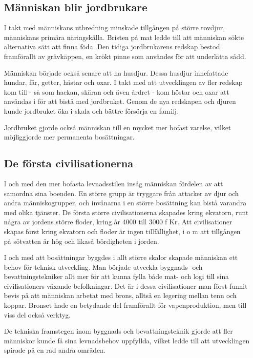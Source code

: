 \documentclass[a4paper,12pt,fleqn]{article}
\begin{document}
\subsection{Människan blir jordbrukare}
I takt med människans utbredning minskade tillgången på större rovdjur, människans primära näringskälla. Bristen på mat ledde till att människan sökte alternativa sätt att finna föda. Den tidiga jordbrukarens redskap bestod framförallt av grävkäppen, en krökt pinne som användes för att underlätta sådd. 

Människan började också senare att ha husdjur. Dessa husdjur innefattade hundar, får, getter, hästar och oxar. I takt med att utvecklingen av fler redskap kom till - så som hackan, skäran och även årdret -  kom höstar och oxar att användas i för att bistå med jordbruket. Genom de nya redskapen och djuren kunde jordbruket öka i skala och bättre försörja en familj. 

Jordbruket gjorde också människan till en mycket mer bofast varelse, vilket möjliggjorde mer permanenta bosättningar. 

\subsection{De första civilisationerna}

I och med den mer bofasta levnadsstilen insåg människan fördelen av att samordna sina boenden. En större grupp är tryggare från attacker av djur och andra människogrupper, och invånarna i en större bosättning kan bistå varandra med olika tjänster. De första större civilisationerna skapades kring ekvatorn, runt några av jordens större floder, kring år 4000 till 3000 f Kr. Att civilisationer skapas först kring ekvatorn och floder är ingen tillfällighet, i o m att tillgången på sötvatten är hög och likaså bördigheten i jorden. 

I och med att bosättningar byggdes i allt större skalor skapade människan ett behov för teknisk utveckling. Man började utveckla byggnads- och bevattningstekniker allt mer för att kunna fylla både mat- och logi till sina civilisationers växande befolkningar. Det är i dessa civilisationer man först funnit bevis på att människan arbetat med brons, alltså en legering mellan tenn och koppar. Bronset hade en betydande del framförallt för vapenproduktion, men till viss del också verktyg. 

De tekniska framstegen inom byggnads och bevattningsteknik gjorde att fler människor kunde få sina levnadsbehov uppfyllda, vilket ledde till att utvecklingen spirade på en rad andra områden. 
\end{document}
